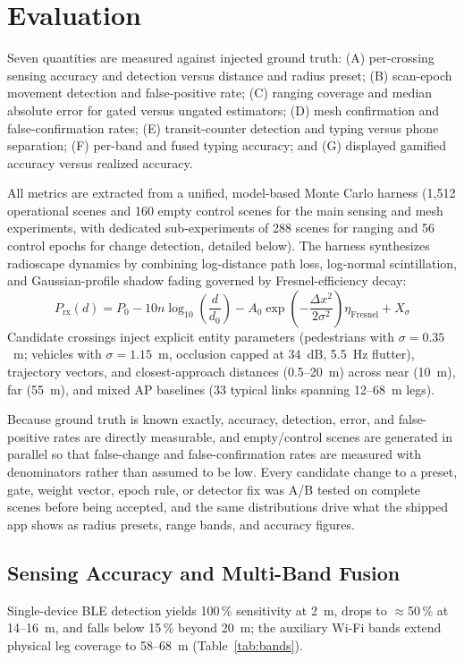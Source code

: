 \documentclass[journal,10pt]{IEEEtran}
\begin{document}
\section{Evaluation}

Seven quantities are measured against injected ground truth: (A) per-crossing
sensing accuracy and detection versus distance and radius preset; (B)
scan-epoch movement detection and false-positive rate; (C) ranging coverage
and median absolute error for gated versus ungated estimators; (D) mesh
confirmation and false-confirmation rates; (E) transit-counter detection and
typing versus phone separation; (F) per-band and fused typing accuracy; and
(G) displayed gamified accuracy versus realized accuracy.

All metrics are extracted from a unified, model-based Monte Carlo harness
(1,512 operational scenes and 160 empty control scenes for the main sensing
and mesh experiments, with dedicated sub-experiments of 288 scenes for
ranging and 56 control epochs for change detection, detailed below). The
harness synthesizes radioscape dynamics by combining log-distance path loss,
log-normal scintillation, and Gaussian-profile shadow fading governed by
Fresnel-efficiency decay:
\begin{equation}
P_{\mathrm{rx}}(d) = P_0 - 10n \log_{10}\left(\frac{d}{d_0}\right) - A_0 \exp\left(-\frac{\Delta x^2}{2\sigma^2}\right) \eta_{\mathrm{Fresnel}} + X_\sigma
\label{eq:pathloss}
\end{equation}
Candidate crossings inject explicit entity parameters (pedestrians with
$\sigma = 0.35$~m; vehicles with $\sigma = 1.15$~m, occlusion capped at
34~dB, 5.5~Hz flutter), trajectory vectors, and closest-approach distances
(0.5--20~m) across near (10~m), far (55~m), and mixed AP baselines (33
typical links spanning 12--68~m legs).

Because ground truth is known exactly, accuracy, detection, error, and
false-positive rates are directly measurable, and empty/control scenes are
generated in parallel so that false-change and false-confirmation rates are
measured with denominators rather than assumed to be low. Every candidate
change to a preset, gate, weight vector, epoch rule, or detector fix was A/B
tested on complete scenes before being accepted, and the same distributions
drive what the shipped app shows as radius presets, range bands, and
accuracy figures.

\subsection{Sensing Accuracy and Multi-Band Fusion}
Single-device BLE detection yields 100\,\% sensitivity at 2~m, drops to
$\approx$50\,\% at 14--16~m, and falls below 15\,\% beyond 20~m; the
auxiliary Wi-Fi bands extend physical leg coverage to 58--68~m
(Table~\ref{tab:bands}).
\end{document}
